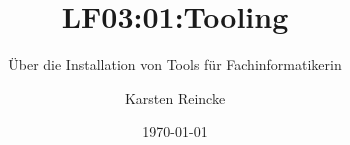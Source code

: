 \documentclass[]{beamer}
\title{LF03:01:Tooling}
\subtitle{Über die Installation von Tools für Fachinformatikerin}
\institute[GS-LDK]{Gewerbliche Schulen Dillenburg}
\author{Karsten Reincke}
\date{\today}
\def\cfgGl{../../../cfg.gl/}
\begin{document}

\begin{frame}
  \titlepage

  
\end{frame}






\logo{}
\newpage



%
\end{document}
